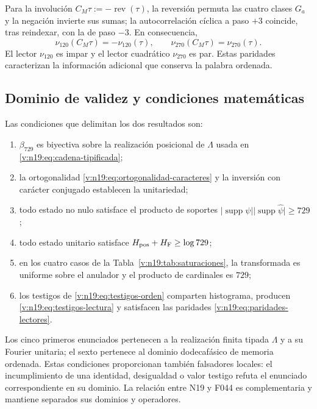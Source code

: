 Para la involución \(C_M\tau:=-\operatorname{rev}(\tau)\), la reversión
permuta las cuatro clases \(G_a\) y la negación invierte sus sumas;
la autocorrelación cíclica a paso \(+3\) coincide, tras reindexar, con
la de paso \(-3\). En consecuencia,
\begin{equation}
 \nu_{120}(C_M\tau)=-\nu_{120}(\tau),\qquad
 \nu_{270}(C_M\tau)=\nu_{270}(\tau).
 \label{v:n19:eq:paridades-lectores}
\end{equation}
El lector \(\nu_{120}\) es impar y el lector cuadrático \(\nu_{270}\) es
par. Estas paridades caracterizan la información adicional que conserva
la palabra ordenada.

\subsection{Dominio de validez y condiciones matemáticas}
\label{v:n19:sec:falsadores}

Las condiciones que delimitan los dos resultados son:
\begin{enumerate}
 \item \(\beta_{729}\) es biyectiva sobre la realización posicional de
 \(\Lambda\) usada en \eqref{v:n19:eq:cadena-tipificada};
 \item la ortogonalidad \eqref{v:n19:eq:ortogonalidad-caracteres} y la
 inversión con carácter conjugado establecen la unitariedad;
 \item todo estado no nulo satisface el producto de soportes
 \(\lvert\operatorname{supp}\psi\rvert
 \lvert\operatorname{supp}\widehat\psi\rvert\ge729\);
 \item todo estado unitario satisface
 \(H_{\rm pos}+H_{\rm F}\ge\log729\);
 \item en los cuatro casos de la
 Tabla~\ref{v:n19:tab:saturaciones}, la transformada es uniforme sobre el
 anulador y el producto de cardinales es \(729\);
 \item los testigos de \eqref{v:n19:eq:testigos-orden} comparten
 histograma, producen \eqref{v:n19:eq:testigos-lectura} y satisfacen las
 paridades \eqref{v:n19:eq:paridades-lectores}.
\end{enumerate}
Los cinco primeros enunciados pertenecen a la realización finita tipada
\(\Lambda\) y a su Fourier unitaria; el sexto pertenece al dominio
dodecafásico de memoria ordenada. Estas condiciones proporcionan también
falsadores locales: el incumplimiento de una identidad, desigualdad o
valor testigo refuta el enunciado correspondiente en su dominio. La
relación entre N19 y F044 es complementaria y mantiene separados sus
dominios y operadores.
